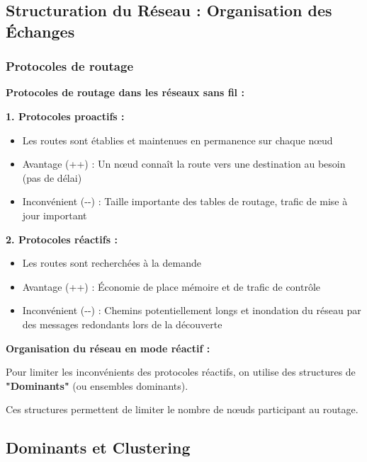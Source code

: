 \documentclass[12pt,a4paper]{article}
\begin{document}
\newpage
\subsection{Structuration du Réseau : Organisation des Échanges}

\subsubsection{Protocoles de routage}

\begin{definition}
\textbf{Protocoles de routage dans les réseaux sans fil :}

\textbf{1. Protocoles proactifs :}
\begin{itemize}
    \item Les routes sont établies et maintenues en permanence sur chaque nœud
    \item \textcolor{defvert}{Avantage (++)} : Un nœud connaît la route vers une destination au besoin (pas de délai)
    \item \textcolor{importantrouge}{Inconvénient (-{}-)} : Taille importante des tables de routage, trafic de mise à jour important
\end{itemize}

\textbf{2. Protocoles réactifs :}
\begin{itemize}
    \item Les routes sont recherchées à la demande
    \item \textcolor{defvert}{Avantage (++)} : Économie de place mémoire et de trafic de contrôle
    \item \textcolor{importantrouge}{Inconvénient (-{}-)} : Chemins potentiellement longs et inondation du réseau par des messages redondants lors de la découverte
\end{itemize}
\end{definition}

\begin{notecours}
\textbf{Organisation du réseau en mode réactif :}

Pour limiter les inconvénients des protocoles réactifs, on utilise des structures de \textcolor{algoviolet}{\textbf{"Dominants"}} (ou ensembles dominants).

Ces structures permettent de limiter le nombre de nœuds participant au routage.
\end{notecours}

\newpage
\subsection{Dominants et Clustering}
\end{document}
